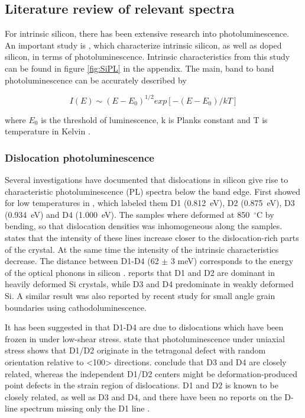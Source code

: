 \subsection{Literature review of relevant spectra}

For intrinsic silicon, there has been extensive research into photoluminescence. An important study is \cite{dean67}, which characterize intrinsic silicon, as well as doped silicon, in terms of photoluminescence. Intrinsic characteristics from this study can be found in figure \ref{fig:SiPL} in the appendix. The main, band to band photoluminescence can be accurately described by 

\begin{equation}
I(E)\sim(E-E_0)^{1/2}exp[-(E-E_0)/kT]
\label{eq:to_line}
\end{equation}

where $E_0$ is the threshold of luminescence, k is Planks constant and T is temperature in Kelvin \cite{davies88}.

\subsubsection{Dislocation photoluminescence}

Several investigations have documented that dislocations in silicon give rise to characteristic photoluminescence (PL) spectra below the band edge. First showed for low temperatures in \cite{drozdov76}, which labeled them D1 (0.812~eV), D2 (0.875~eV), D3 (0.934~eV) and D4 (1.000~eV). The samples where deformed at 850~$^\circ$C by bending, so that dislocation densities was inhomogeneous along the samples. \cite{drozdov76} states that the intensity of these lines increase closer to the dislocation-rich parts of the crystal. At the same time the intensity of the intrinsic characteristics decrease. The distance between D1-D4 (62 $\pm$ 3 meV) corresponds to the energy of the optical phonons in silicon \cite{drozdov76}. \cite{drozdov76} reports that D1 and D2 are dominant in heavily deformed Si crystals, while D3 and D4 predominate in weakly deformed Si. A similar result was also reported by recent study \cite{lee09} for small angle grain boundaries using cathodoluminescence.

It has been suggested in \cite{sauer85} that D1-D4 are due to dislocations which have been frozen in under low-shear stress. \cite{sauer85} state that photoluminescence under uniaxial stress shows that D1/D2 originate in the tetragonal defect with random orientation relative to <100> directions. \cite{sauer85} conclude that D3 and D4 are closely related, whereas the independent D1/D2 centers might be deformation-produced point defects in the strain region of dislocations. D1 and D2 is known to be closely related, as well as D3 and D4, and there have been no reports on the D-line spectrum missing only the D1 line \cite{sugimoto06}.

